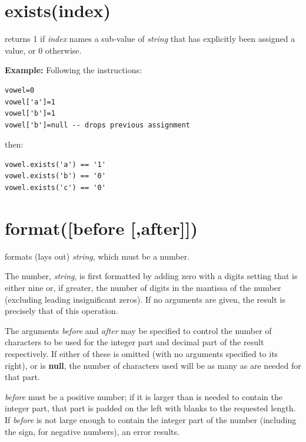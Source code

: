 \section{exists(index)}\label{refexists}

returns 1 if \emph{index} names a  sub-value %
of
\emph{string} that has explicitly been assigned a value, or 0
otherwise.
 
\textbf{Example:}
 Following the instructions:
\begin{lstlisting}
vowel=0
vowel['a']=1
vowel['b']=1
vowel['b']=null -- drops previous assignment
\end{lstlisting}
then:
\begin{lstlisting}
vowel.exists('a') == '1'
vowel.exists('b') == '0'
vowel.exists('c') == '0'
\end{lstlisting}

\section{format([before [,after]])}\label{refformat}

formats (lays out) \emph{string}, which must be a number.
 
The number, \emph{string}, is first formatted by adding zero with a
digits setting that is either nine or, if greater, the number of digits
in the mantissa of the number (excluding leading insignificant zeros).
If no arguments are given, the result is precisely that of this
operation.
 
The arguments \emph{before} and \emph{after} may be specified to
control the number of characters to be used for the integer part and
decimal part of the result respectively.  If either of these is omitted
(with no arguments specified to its right), or is \textbf{null}, the
number of characters used will be as many as are needed for that part.
 
\emph{before} must be a positive number; if it is larger than is
needed to contain the integer part, that part is padded on the left with
blanks to the requested length.
If \emph{before} is not large enough to contain the integer part
of the number (including the sign, for negative numbers), an error
results.
 

